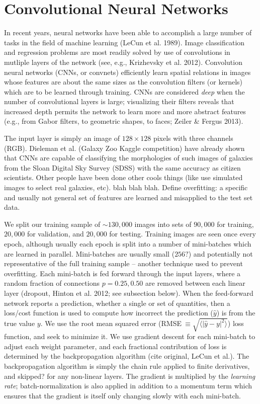 \documentclass[fleqn,usenatbib]{mnras}
\begin{document}
\section{Convolutional Neural Networks}\label{sec:CNN}
In recent years, neural networks have been able to accomplish a large number of tasks in the field of machine learning (LeCun et al. 1989).
Image classification and regression problems are most readily solved by use of convolutions in mutliple layers of the network (see, e.g., Krizhevsky et al. 2012).
Convolution neural networks (CNNs, or convnets) efficiently learn spatial relations in images whose features are about the same sizes as the convolution filters (or kernels) which are to be learned through training.
CNNs are considered \textit{deep} when the number of convolutional layers is large; visualizing their filters reveals that increased depth permits the network to learn more and more abstract features (e.g., from Gabor filters, to geometric shapes, to faces; Zeiler \& Fergus 2013).

The input layer is simply an image of $128\times 128$ pixels with three channels (RGB).
Dieleman et al. (Galaxy Zoo Kaggle competition) have already shown that CNNs are capable of classifying the morphologies of such images of galaxies from the Sloan Digital Sky Survey (SDSS) with the same accuracy as citizen scientists.
Other people have been done other cools things (like use simulated images to select real galaxies, etc).
blah blah blah.
Define overfitting: a specific and usually not general set of features are learned and misapplied to the test set data.

We split our training sample of $\sim 130,000$ images into sets of $90,000$ for training, $20,000$ for validation, and $20,000$ for testing.
Training images are seen once every epoch, although usually each epoch is split into a number of mini-batches which are learned in parallel.
Mini-batches are usually small ($256?$) and potentially not representative of the full training sample -- another technique used to prevent overfitting.
Each mini-batch is fed forward through the input layers, where a random fraction of connections $p=0.25, 0.50$ are removed between each linear layer (dropout, Hinton et al. 2012; see subsection below).
When the feed-forward network reports a prediction, whether a single or set of quantities, then a loss/cost function is used to compute how incorrect the prediction ($\hat y$) is from the true value $y$.
We use the root mean squared error (RMSE$~\equiv \sqrt{\langle |\hat y - y|^2\rangle}$) loss function, and seek to minimize it.
We use gradient descent for each mini-batch to adjust each weight parameter, and each fractional contribution of loss is determined by the backpropagation algorithm (cite original, LeCun et al.). 
The backpropagation algorithm is simply the chain rule applied to finite derivatives, and skipped? for any non-linear layers.
The gradient is multiplied by the \textit{learning rate}; batch-normalization is also applied in addition to a momentum term which ensures that the gradient is itself only changing slowly with each mini-batch.
\end{document}

